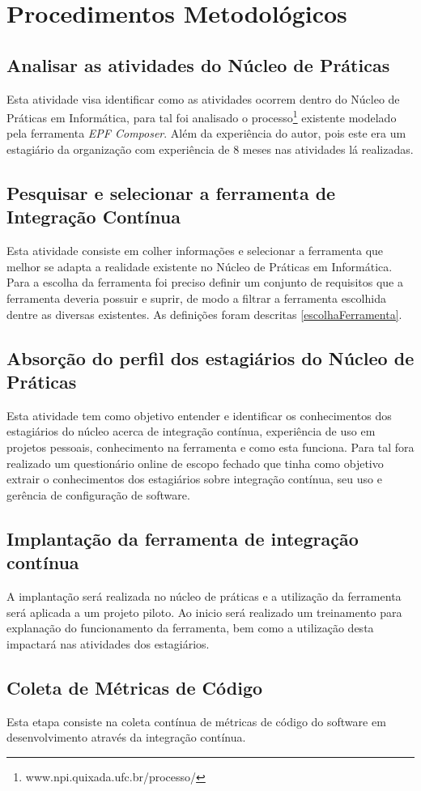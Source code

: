 \chapter{Procedimentos Metodológicos}\label{metodologia}

\section{Analisar as atividades do Núcleo de Práticas}
Esta atividade visa identificar como as atividades ocorrem dentro do Núcleo de Práticas em Informática, para tal foi analisado o processo\footnote{www.npi.quixada.ufc.br/processo/} existente modelado pela ferramenta \textit{EPF Composer}. Além da experiência do autor, pois este era um estagiário da organização com experiência de 8 meses nas atividades lá realizadas. 

\section{Pesquisar e selecionar a ferramenta de Integração Contínua}

Esta atividade consiste em  colher informações e selecionar a ferramenta que melhor se adapta a realidade existente no Núcleo de Práticas em Informática. 
Para a escolha da ferramenta foi preciso definir um conjunto de requisitos que a ferramenta deveria possuir e suprir, de modo a filtrar a ferramenta escolhida dentre as diversas existentes. As definições foram descritas \autoref{escolhaFerramenta}. 

\section{Absorção do perfil dos estagiários do Núcleo de Práticas}
Esta atividade tem como objetivo entender e identificar os conhecimentos dos estagiários do núcleo acerca de integração contínua, experiência de uso em projetos pessoais, conhecimento na ferramenta e como esta funciona. Para tal fora realizado um questionário online de escopo fechado que tinha como objetivo extrair o conhecimentos dos estagiários sobre integração contínua, seu uso e gerência de configuração de software.

\section{Implantação da ferramenta de integração contínua}
A implantação será realizada no núcleo de práticas e a utilização da ferramenta será aplicada a um projeto piloto. Ao inicio será realizado um treinamento para explanação do funcionamento da ferramenta, bem como a utilização desta impactará nas atividades dos estagiários.

\section{Coleta de Métricas de Código}
Esta etapa consiste na coleta contínua de métricas de código do software em desenvolvimento através da integração contínua.
